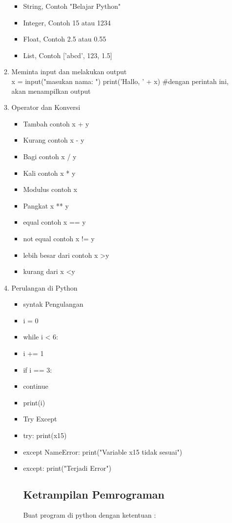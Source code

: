 \begin{enumerate}
\begin{enumerate}
\begin{itemize}
\item String, Contoh "Belajar Python"
\item Integer, Contoh 15 atau 1234
\item Float, Contoh 2.5 atau 0.55
\item List, Contoh ['abcd', 123, 1.5]
\end{itemize}
\item Meminta input dan melakukan output\\
x = input("masukan nama: ")
print('Hallo, ' + x) \#dengan perintah ini, akan menampilkan output
\item Operator dan Konversi
\begin{itemize}
\item Tambah contoh x + y
\item Kurang contoh x - y
\item Bagi contoh x / y
\item Kali contoh x * y
\item Modulus contoh x %
\item Pangkat x ** y
\item equal contoh x == y
\item not equal contoh x != y
\item lebih besar dari contoh x \textgreater y
\item kurang dari x \textless y
\end{itemize}
\item Perulangan di Python
\begin{itemize}
\item syntak Pengulangan
\item i = 0
\item while i < 6:
\item  i += 1 
 \item if i == 3:
   \item continue
 \item print(i)
\end{itemize}
\begin{itemize}
\item Try Except
\item try:
  print(x15)
\item except NameError:
  print("Variable x15 tidak sesuai")
\item except:
  print("Terjadi Error")

\subsection{Ketrampilan Pemrograman}
Buat program di python dengan ketentuan :


\end{itemize}
\end{enumerate}
\end{enumerate}
